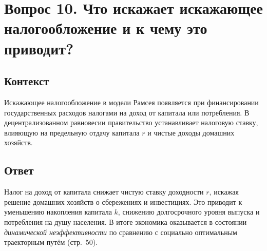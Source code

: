 \section*{Вопрос 10. Что искажает искажающее налогообложение и к чему это приводит?}

\subsection*{Контекст}
Искажающее налогообложение в модели Рамсея появляется при финансировании государственных расходов налогами на доход 
от капитала или потребления. В децентрализованном равновесии правительство устанавливает налоговую ставку, влияющую 
на предельную отдачу капитала \(r\) и чистые доходы домашних хозяйств.  

\subsection*{Ответ}
Налог на доход от капитала снижает чистую ставку доходности \(r\), искажая решение домашних хозяйств о сбережениях и инвестициях. 
Это приводит к уменьшению накопления капитала \(k\), снижению долгосрочного уровня выпуска и потребления на душу населения. 
В итоге экономика оказывается в состоянии \emph{динамической неэффективности} по сравнению с социально оптимальным траекторным путём 
(стр.~50).
